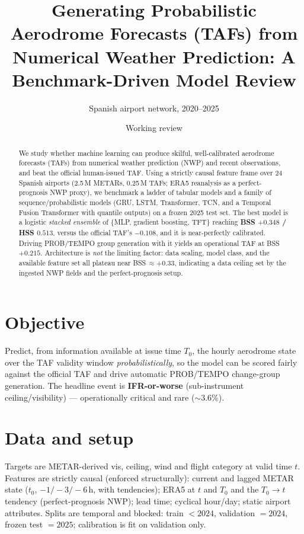 \documentclass[11pt]{article}
\title{Generating Probabilistic Aerodrome Forecasts (TAFs) from\\
Numerical Weather Prediction: A Benchmark-Driven Model Review}
\author{Spanish airport network, 2020--2025}
\date{Working review}
\begin{document}
\maketitle

\begin{abstract}
We study whether machine learning can produce skilful, well-calibrated aerodrome forecasts
(TAFs) from numerical weather prediction (NWP) and recent observations, and beat the
official human-issued TAF. Using a strictly causal feature frame over 24 Spanish airports
(2.5\,M METARs, 0.25\,M TAFs; ERA5 reanalysis as a perfect-prognosis NWP proxy), we
benchmark a ladder of tabular models and a family of sequence/probabilistic models (GRU,
LSTM, Transformer, TCN, and a Temporal Fusion Transformer with quantile outputs) on a
frozen 2025 test set. The best model is a logistic \emph{stacked ensemble} of
\{MLP, gradient boosting, TFT\} reaching \textbf{BSS $+0.348$ / HSS $0.513$}, versus the
official TAF's $-0.108$, and it is near-perfectly calibrated. Driving PROB/TEMPO group
generation with it yields an operational TAF at BSS $+0.215$. Architecture is \emph{not}
the limiting factor: data scaling, model class, and the available feature set all plateau
near BSS\,$\approx +0.33$, indicating a data ceiling set by the ingested NWP fields and the
perfect-prognosis setup.
\end{abstract}

\section{Objective}
Predict, from information available at issue time $T_0$, the hourly aerodrome state over the
TAF validity window \emph{probabilistically}, so the model can be scored fairly against the
official TAF and drive automatic PROB/TEMPO change-group generation. The headline event is
\textbf{IFR-or-worse} (sub-instrument ceiling/visibility) --- operationally critical and
rare ($\sim$3.6\%).

\section{Data and setup}
Targets are METAR-derived vis, ceiling, wind and flight category at valid time $t$. Features
are strictly causal (enforced structurally): current and lagged METAR state ($t_0$,
$-1/-3/-6$\,h, with tendencies); ERA5 at $t$ and $T_0$ and the $T_0\!\to\!t$ tendency
(perfect-prognosis NWP); lead time; cyclical hour/day; static airport attributes. Splits are
temporal and blocked: train $<2024$, validation $=2024$, frozen test $=2025$; calibration is
fit on validation only.
\end{document}
